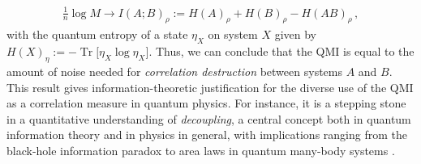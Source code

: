 \documentclass[a4paper,aps,prl,twocolumn,10pt,superscriptaddress]{revtex4-1}
\theoremstyle{plain}
\theoremstyle{definition}
\begin{document}
\begin{align*}
\frac{1}{n}\log M\to I(A;B)_{\rho}:=H(A)_{\rho}+H(B)_{\rho}-H(AB)_{\rho}\,,
\end{align*}
with the quantum entropy of a state $\eta_{X}$ on system $X$ given by $H(X)_{\eta}:=-\operatorname{Tr}\big[\eta_{X}\log\eta_{X}\big]$. Thus, we can conclude that the QMI is equal to the amount of noise needed for {\it correlation destruction} between systems $A$ and $B$. This result gives information-theoretic justification for the diverse use of the QMI as a correlation measure in quantum physics. For instance, it is a stepping stone in a quantitative understanding of \textit{decoupling}, a central concept both in quantum information theory and in physics in general, with implications ranging from the black-hole information paradox \cite{HayPre07,braunstein-pati,braunstein-zyczkowski} to  area laws in quantum many-body systems \cite{Brandao12}. 

\end{document}
